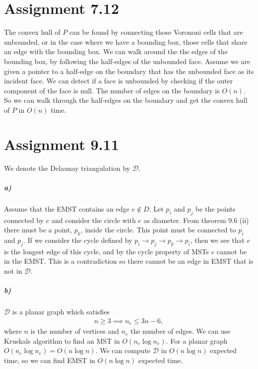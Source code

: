 \documentclass[10pt,a4paper,final,oneside,openany,article,oldfontcommands]{memoir}
\newcommand{\D}{\mathcal{D}}
\begin{document}
\chapter*{Assignment 7.12}
The convex hull of $P$ can be found by connecting those Vorononi cells that
are unbounded, or in the case where we have a bounding box, those cells that
share an edge with the bounding box. We can walk around the the edges of the
bounding box, by following the half-edges of the unbounded face. Assume we are
given a pointer to a half-edge on the boundary that has the unbounded face
as its incident face. We can detect if a face is unbounded by checking if
the outer component of the face is null. The number of edges on the boundary
is $O(n)$. So we can walk through the half-edges on the boundary and get the
convex hull of $P$ in $O(n)$ time.


\chapter*{Assignment 9.11}
We denote the Delaunay triangulation by $\D$.
\paragraph{a)}
Assume that the EMST contains an edge $e \notin D$. Let $p_i$ and $p_j$ be the
points connected by $e$ and consider the circle with $e$ as diameter. From
theorem 9.6 (ii) there must be a point, $p_k$, inside the circle. This point
must be connected to $p_i$ and $p_j$. If we consider the cycle defined by $p_i
\to p_j \to p_k \to p_i$, then we see that $e$ is the longest edge of this
cycle, and by the cycle property of MSTs $e$ cannot be in the EMST. This is a
contradiction so there cannot be an edge in EMST that is not in $\D$.


\paragraph{b)}
$\D$ is a planar graph which satisfies
\begin{align*}
  n \ge 3 \implies n_e \le 3n - 6,
\end{align*}
where $n$ is the number of vertices and $n_e$ the number of edges. We can use
Kruskals algorithm to find an MST in $O(n_e \log n_e)$. For a planar graph
$O(n_e \log n_e) = O(n \log n)$. We can compute $\D$ in $O(n \log n)$ expected
time, so we can find EMST in $O(n \log n)$ expected time.

\printbibliography
\end{document}
